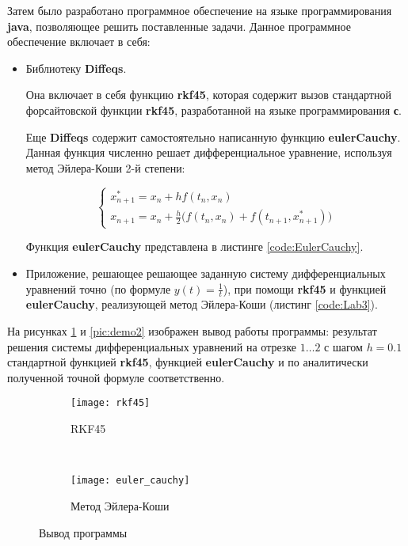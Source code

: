 Затем было разработано программное обеспечение на языке программирования \textbf{java}, позволяющее решить поставленные задачи. Данное программное обеспечение включает в себя:
\begin{itemize}

\item Библиотеку \textbf{Diffeqs}.

 Она включает в себя функцию \textbf{rkf45}, которая содержит вызов стандартной форсайтовской функции \textbf{rkf45}, разработанной на языке программирования \textbf{с}.

 Еще \textbf{Diffeqs} содержит самостоятельно написанную функцию \textbf{eulerCauchy}. Данная функция численно решает дифференциальное уравнение, используя метод Эйлера-Коши 2-й степени:
 
\begin{displaymath}
\begin{cases}
	x_{n+1}^{*} = x_n + hf(t_n, x_n)
	\\
	x_{n+1} = x_n + \frac{h}{2} \Big (f(t_n, x_n) + f(t_{n+1}, x_{n+1}^{*}) \Big) 
\end{cases}
\end{displaymath} 
 
 Функция \textbf{eulerCauchy} представлена в листинге \ref{code:EulerCauchy}.

\item Приложение, решающее решающее заданную систему дифференциальных уравнений точно (по формуле $y(t) = \frac{1}{t}$), при помощи \textbf{rkf45} и функцией \textbf{eulerCauchy}, реализующей метод Эйлера-Коши (листинг \ref{code:Lab3}).

\end{itemize}

На рисунках \ref{pic:demo1} и \ref{pic:demo2} изображен вывод работы программы: результат решения системы дифференциальных уравнений на отрезке $1\dots2$ с шагом $h=0.1$ стандартной функцией \textbf{rkf45}, функцией \textbf{eulerCauchy} и по аналитически полученной точной формуле соответственно.

\begin{figure}[H]
    \centering
    \begin{subfigure}[t]{0.5\textwidth}
        \centering
        \texttt{[image: rkf45]}
        \caption{RKF45}
    \end{subfigure}%
    ~ 
    \begin{subfigure}[t]{0.5\textwidth}
        \centering
        \texttt{[image: euler\_cauchy]}
        \caption{Метод Эйлера-Коши}
    \end{subfigure}
    \caption{Вывод программы}
    \label{pic:demo1}
\end{figure}

